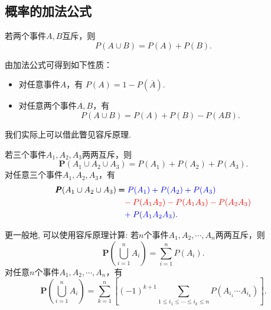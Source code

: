 \subsection{概率的加法公式}
\begin{proposition}[加法公式]
    若两个事件$A,B$互斥，则
    $$P(A\cup B)=P(A)+P(B).$$
\end{proposition}

\begin{remark}
    由加法公式可得到如下性质：
    \begin{itemize}
        \item 对任意事件$A$，有
              $P(A)=1-P\left(\overline{A}\right).$
        \item 对任意两个事件$A,B$，有
              $$P(A\cup B)=P(A)+P(B)-P(AB).$$
    \end{itemize}
\end{remark}

\begin{asidebox}
    我们实际上可以借此瞥见容斥原理. 
\begin{remark}
    若三个事件$A_1, A_2, A_3$两两互斥，则
    $$\pmb P(A_1 \cup A_2 \cup A_3) = P(A_1)+P(A_2)+P(A_3).$$
    对任意三个事件$A_1, A_2, A_3$，有
    \begin{align*}
        \pmb P(A_1 \cup A_2 \cup A_3) & \pmb=\color{blue}P(A_1)+P(A_2)+P(A_3)              \\
                                      & \phantom=\color{red}-P(A_1A_2)-P(A_1A_3)-P(A_2A_3) \\
                                      & \phantom=\color{blue}+P(A_1A_2A_3).
    \end{align*}%
\end{remark}

\begin{remark}
    更一般地, 可以使用容斥原理计算: 
    若$n$个事件$A_1, A_2, \cdots, A_n$两两互斥，则
    $$\pmb P\left( \bigcup_{i=1}^n A_i \right)=\sum_{i=1}^n P(A_i).$$
    \vspace{0.2in}
    对任意$n$个事件$A_1, A_2, \cdots, A_n$，有
    $$\pmb P\left( \bigcup_{i=1}^n A_i \right)=\sum_{k=1}^n \left[ (-1)^{k+1} \sum_{1\le i_1\le \cdots\le i_k \le n} P(A_{i_1}\cdots A_{i_k}) \right].$$
\end{remark}


\end{asidebox}

